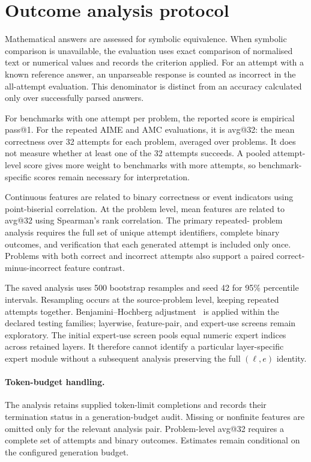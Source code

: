 \documentclass[12pt,a4paper,twoside,openright]{book}
\begin{document}
\section{Outcome analysis protocol}
\label{sec:setup-evaluation}

Mathematical answers are assessed for symbolic equivalence. When symbolic
comparison is unavailable, the evaluation uses exact comparison of
normalised text or numerical values and records the criterion applied. For an attempt
with a known reference answer, an unparseable response is counted as
incorrect in the all-attempt evaluation. This denominator is distinct from
an accuracy calculated only over successfully parsed answers.

For benchmarks with one attempt per problem, the reported score is empirical
pass@1. For the repeated AIME and AMC evaluations, it is avg@32: the mean
correctness over 32 attempts for each problem, averaged over problems. It
does not measure whether at least one of the 32 attempts succeeds. A pooled
attempt-level score gives more weight to benchmarks with more attempts, so
benchmark-specific scores remain necessary for interpretation.

Continuous features are related to binary correctness or event indicators
using point-biserial correlation. At the problem level, mean features are
related to avg@32 using Spearman's rank correlation. The primary repeated-
problem analysis requires the full set of unique attempt identifiers,
complete binary outcomes, and verification that each generated attempt is
included only once. Problems with both correct and incorrect attempts also
support a paired correct-minus-incorrect feature contrast.

The saved analysis uses 500 bootstrap resamples and seed 42 for 95\%
percentile intervals. Resampling occurs at the source-problem level, keeping
repeated attempts together. Benjamini--Hochberg adjustment~\cite{benjamini1995fdr}
is applied within the declared testing families; layerwise,
feature-pair, and expert-use screens remain exploratory. The initial
expert-use screen pools equal numeric expert indices across retained layers.
It therefore cannot identify a particular layer-specific expert module
without a subsequent analysis preserving the full $(\ell,e)$ identity.

\paragraph{Token-budget handling.}
The analysis retains supplied token-limit completions and records their
termination status in a generation-budget audit. Missing or nonfinite
features are omitted only for the relevant analysis pair. Problem-level
avg@32 requires a complete set of attempts and binary outcomes. Estimates
remain conditional on the configured generation budget.
\end{document}
